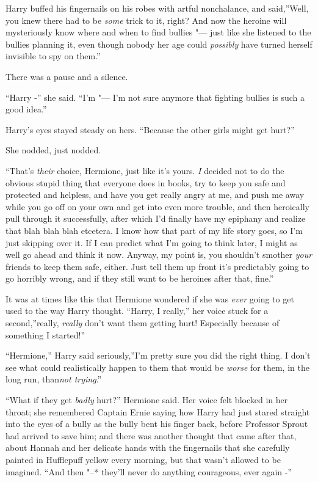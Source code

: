 Harry buffed his fingernails on his robes with artful nonchalance, and
said,''Well, you knew there had to be \emph{some} trick to it, right?
And now the heroine will mysteriously know where and when to find
bullies "--- just like she listened to the bullies planning it, even though
nobody her age could \emph{possibly} have turned herself invisible to
spy on them.''

There was a pause and a silence.

``Harry -'' she said. ``I'm "--- I'm not sure anymore that fighting bullies
is such a good idea.''

Harry's eyes stayed steady on hers. ``Because the other girls might get
hurt?''

She nodded, just nodded.

``That's \emph{their} choice, Hermione, just like it's yours. \emph{I}
decided not to do the obvious stupid thing that everyone does in books,
try to keep you safe and protected and helpless, and have you get really
angry at me, and push me away while you go off on your own and get into
even more trouble, and then heroically pull through it successfully,
after which I'd finally have my epiphany and realize that blah blah blah
etcetera. I know how that part of my life story goes, so I'm just
skipping over it. If I can predict what I'm going to think later, I
might as well go ahead and think it now. Anyway, my point is, you
shouldn't smother \emph{your} friends to keep them safe, either. Just
tell them up front it's predictably going to go horribly wrong, and if
they still want to be heroines after that, fine.''

It was at times like this that Hermione wondered if she was \emph{ever}
going to get used to the way Harry thought. ``Harry, I really,'' her
voice stuck for a second,''really, \emph{really} don't want them getting
hurt! Especially because of something I started!''

``Hermione,'' Harry said seriously,''I'm pretty sure you did the right
thing. I don't see what could realistically happen to them that would be
\emph{worse} for them, in the long run, than\emph{not trying}.''

``What if they get \emph{badly} hurt?'' Hermione said. Her voice felt
blocked in her throat; she remembered Captain Ernie saying how Harry had
just stared straight into the eyes of a bully as the bully bent his
finger back, before Professor Sprout had arrived to save him; and there
was another thought that came after that, about Hannah and her delicate
hands with the fingernails that she carefully painted in Hufflepuff
yellow every morning, but that wasn't allowed to be imagined. ``And then
"--* they'll never do anything courageous, ever again -''

